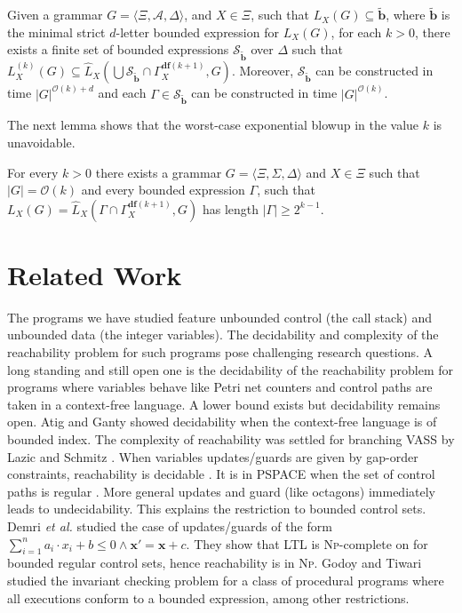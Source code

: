 \documentclass[final]{llncs}
\renewcommand{\vec}[1]{{\bf {#1}}}
\def\tuple#1{{\langle #1 \rangle}}
\def\len#1{{\vert{#1}\vert}}
\def\prod{\Delta}
\def\patt{{\widetilde{\mathbf{b}}}}
\def\df#1{\scriptscriptstyle\mathbf{df}(#1)}
\def\Vars{\ensuremath{\Xi}}
\renewcommand{\vec}[1]{{\mathbf {#1}}}
\begin{document}
\begin{theorem}\label{thm:letter-bounded-control-set}
Given a grammar \(G = \tuple{\Vars, \mathcal{A}, \prod}\),
and \(X \in \Vars\), such that \(L_X(G) \subseteq \patt\),
where \(\patt\) is the minimal strict \(d\)-letter bounded expression
for \(L_X(G)\), for each \(k > 0\), there exists a finite set 
of bounded expressions \(\mathcal{S}_\patt\) over \(\prod\) such that 
\(L_X^{(k)}(G) \subseteq \hat{L}_X(\bigcup\mathcal{S}_\patt \cap \Gamma_X^{\df{k+1}}, G)\).
Moreover, \(\mathcal{S}_\patt\) can be constructed in
time \(\len{G}^{\mathcal{O}(k)+d}\) and each
$\Gamma\in\mathcal{S}_\patt$ can be constructed in
time \(\len{G}^{\mathcal{O}(k)}\).
\end{theorem}
The next lemma shows that the worst-case exponential blowup in the value \(k\)
is unavoidable. 

\begin{lemma}\label{lem:optimality}
For every \(k>0\) there exists a
grammar \(G=\tuple{\Vars,\Sigma,\prod}\) and
\(X\in\Vars\) such that \(\len{G}=\mathcal{O}(k)\) and
every bounded expression \(\Gamma\), such that
\(L_X(G)=\hat{L}_X(\Gamma \cap \Gamma_X^{\df{k+1}},G)\) 
has length \(\len{\Gamma} \geq 2^{k-1}\).
\end{lemma}


\section{Related Work} 
The programs we have studied feature unbounded control (the
call stack) and unbounded data (the integer variables). The
decidability and complexity of the reachability problem for such
programs pose challenging research questions. A long standing and still
open one is the decidability of the reachability problem for programs
where variables behave like Petri net counters and control paths are
taken in a context-free language.  A lower bound
exists \cite{Lazic__2012} but decidability remains
open. Atig and Ganty \cite{AG11} showed decidability when the
context-free language is of bounded index.  The complexity of
reachability was settled for branching VASS by Lazic and
Schmitz \cite{Lazi__2014}. When variables
updates/guards are given by gap-order constraints, reachability
is decidable \cite{Abdulla_2013,Revesz93}. It is in
PSPACE when the set of control paths is regular \cite{Bozzelli_2014}.  
More general updates and guard (like
octagons) immediately leads to undecidability. This explains the
restriction to bounded control sets. Demri \textit{et
al.} \cite{Demri_2012} studied the case of updates/guards of the
form \(\sum_{i=1}^n a_i \cdot x_i + b
\leq 0 \land \vec{x}' = \vec{x} + c\). They show that LTL is \textsc{Np}-complete  on 
for bounded regular control sets, hence reachability is in \textsc{Np}.
Godoy and Tiwari \cite{GT09} studied the invariant checking problem for a class of procedural programs where all executions
conform to a bounded expression, among other restrictions.
\end{document}
